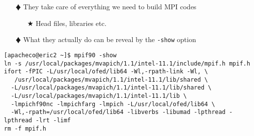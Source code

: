 \documentclass[slidestop,mathserif,compress,xcolor=svgnames,table]{beamer}
\begin{document}
\begin{frame}
\begin{itemize}
\begin{enumerate}
\begin{enumerate}
\end{enumerate}
\item[$\vardiamond$]  They take care of everything we need to build MPI codes
\begin{enumerate}
\item[$\bigstar$]  Head files, libraries etc.
\end{enumerate}
\item[$\vardiamond$]  What they actually do can be reveal by the \texttt{-show} option
\end{enumerate}
\end{itemize}
{\tiny
\begin{alertblock}{}
{%
\begin{verbatim}
[apacheco@eric2 ~]$ mpif90 -show
ln -s /usr/local/packages/mvapich/1.1/intel-11.1/include/mpif.h mpif.h
ifort -fPIC -L/usr/local/ofed/lib64 -Wl,-rpath-link -Wl, \
   /usr/local/packages/mvapich/1.1/intel-11.1/lib/shared \
  -L/usr/local/packages/mvapich/1.1/intel-11.1/lib/shared \
  -L/usr/local/packages/mvapich/1.1/intel-11.1/lib \
  -lmpichf90nc -lmpichfarg -lmpich -L/usr/local/ofed/lib64 \
  -Wl,-rpath=/usr/local/ofed/lib64 -libverbs -libumad -lpthread -lpthread -lrt -limf
rm -f mpif.h
\end{verbatim}
}
\end{alertblock}
}
\end{frame}
\end{document}
